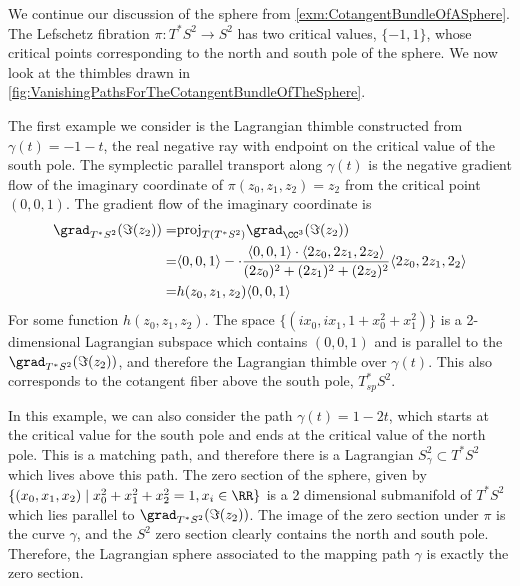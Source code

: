 

    We continue our discussion of the sphere from \cref{exm:CotangentBundleOfASphere}. 
    The Lefschetz fibration $\pi: T^*S^2\to S^2$ has two critical values, $\{-1, 1\}$, whose critical points corresponding to the north and south pole of the sphere. We now look at the thimbles drawn in \cref{fig:VanishingPathsForTheCotangentBundleOfTheSphere}.

    The first example we consider is the Lagrangian thimble constructed from $\gamma(t)=-1-t$, the real negative ray with endpoint on the critical value of the south pole.
    The symplectic parallel transport along $\gamma(t)$ is the negative gradient flow of the imaginary coordinate of $\pi(z_0, z_1, z_2)=z_2$ from the critical point $(0,0,1)$. 
    The gradient flow of the imaginary coordinate is 
    \begin{align*}
        \grad_{T^*S^2}(\Im(z_2))=&\text{proj}_{T(T^*S^2)}\grad_{\CC^3}(\Im(z_2))\\
        =&\langle 0, 0, 1 \rangle-  \cdot\frac{ \langle 0, 0, 1 \rangle\cdot \langle 2z_0, 2z_1, 2z_2 \rangle }{(2z_0)^2+(2z_1)^2+(2z_2)^2}\langle 2z_0, 2z_1, 2_2\rangle\\
        =&  h(z_0, z_1, z_2)\langle 0, 0, 1\rangle
    \end{align*}
    For some function $h(z_0, z_1, z_2)$. 
    The space $\{(ix_0, ix_1, 1+x_0^2+x_1^2)\}$ is a 2-dimensional Lagrangian subspace which contains $(0,0, 1)$ and is parallel to the $\grad_{T^*S^2}(\Im(z_2))$, and therefore the Lagrangian thimble over $\gamma(t)$. 
    This also corresponds to the cotangent fiber above the south pole, $T^*_{sp}S^2$.
    
    In this example, we can also consider the path $\gamma(t)=1-2t$, which starts at the critical value for the south pole and ends at the critical value of the north pole. 
    This is a matching path, and therefore there is a Lagrangian $S^2_{\gamma}\subset T^*S^2$ which lives above this path. 
    The zero section of the sphere, given by $\{(x_0, x_1, x_2)\;|\; x_0^2+x_1^2+x_2^2=1, x_i\in \RR\}$ is a 2 dimensional submanifold of $T^*S^2$ which lies parallel to $\grad_{T^*S^2}(\Im(z_2))$.
    The image of the zero section under $\pi$ is the curve $\gamma$, and the $S^2$ zero section clearly contains the north and south pole.
    Therefore, the Lagrangian sphere associated to the mapping path $\gamma$ is exactly the zero section. 

